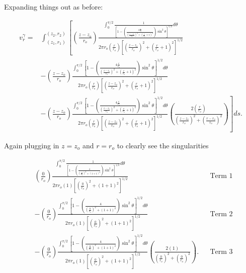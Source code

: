 \noindent Expanding things out as before:

\begin{equation}
\begin{aligned}
    v_{r}^\gamma =& \int_{(z_{1},r_{1})}^{(z_{2},r_{2})}
\left[
%
\left(\frac{z-z_o}{r_o}\right) \frac{\int_0^{\pi/2}\frac{1}{\left[1-\left(\frac{4\frac{r}{r_o}}{\left(\frac{z-z_o}{r_o}\right)^2 + \left(\frac{r}{r_o}+1\right)^2}\right)\sin^2\theta\right]^{1/2}}d\theta}
{2\pi r_o \left(\frac{r}{r_o}\right) \left[\left(\frac{z-z_o}{r_o}\right)^2 + \left(\frac{r}{r_o}+1\right)^2 \right]^{1/2}}  \right. \\
&-
\left(\frac{z-z_o}{r_o}\right) \frac{\int_0^{\pi/2}\left[1-\left(\frac{4\frac{r}{r_o}}{\left(\frac{z-z_o}{r_o}\right)^2 + \left(\frac{r}{r_o}+1\right)^2}\right)\sin^2\theta\right]^{1/2}d\theta}{2\pi r_o \left(\frac{r}{r_o}\right) \left[\left(\frac{z-z_o}{r_o}\right)^2 + \left(\frac{r}{r_o}+1\right)^2 \right]^{1/2}} \\
&-
\left. \left(\frac{z-z_o}{r_o}\right) \frac{\int_0^{\pi/2}\left[1-\left(\frac{4\frac{r}{r_o}}{\left(\frac{z-z_o}{r_o}\right)^2 + \left(\frac{r}{r_o}+1\right)^2}\right)\sin^2\theta\right]^{1/2}d\theta}{2\pi r_o \left(\frac{r}{r_o}\right) \left[\left(\frac{z-z_o}{r_o}\right)^2 + \left(\frac{r}{r_o}+1\right)^2 \right]^{1/2}}
%
\left(\frac{2 \left(\frac{r}{r_o}\right)}{\left(\frac{z-z_o}{r_o}\right)^2 + \left(\frac{r-r_o}{r_o}\right)^2}\right) \right] ds.
\end{aligned}
\end{equation}

\noindent Again plugging in \(z=z_o\) and \(r=r_o\) to clearly see the singularities

\begin{equation}
\begin{aligned}
&\left(\frac{0}{r_o}\right) \frac{\int_0^{\pi/2}\frac{1}{\left[1-\left(\frac{4}{\left(\frac{0}{r_o}\right)^2 + \left(1+1\right)^2}\right)\sin^2\theta\right]^{1/2}}d\theta}
{2\pi r_o \left(1\right) \left[\left(\frac{0}{r_o}\right)^2 + \left(1+1\right)^2 \right]^{1/2}}  && \text{Term 1} \\
&-
\left(\frac{0}{r_o}\right) \frac{\int_0^{\pi/2}\left[1-\left(\frac{4}{\left(\frac{0}{r_o}\right)^2 + \left(1+1\right)^2}\right)\sin^2\theta\right]^{1/2}d\theta}{2\pi r_o \left(1\right) \left[\left(\frac{0}{r_o}\right)^2 + \left(1+1\right)^2 \right]^{1/2}} && \text{Term 2} \\
&-
 \left(\frac{0}{r_o}\right) \frac{\int_0^{\pi/2}\left[1-\left(\frac{4}{\left(\frac{0}{r_o}\right)^2 + \left(1+1\right)^2}\right)\sin^2\theta\right]^{1/2}d\theta}{2\pi r_o \left(1\right) \left[\left(\frac{0}{r_o}\right)^2 + \left(1+1\right)^2 \right]^{1/2}}
%
\left(\frac{2 \left(1\right)}{\left(\frac{0}{r_o}\right)^2 + \left(\frac{0}{r_o}\right)^2}\right). && \text{Term 3}
\end{aligned}
\end{equation}

